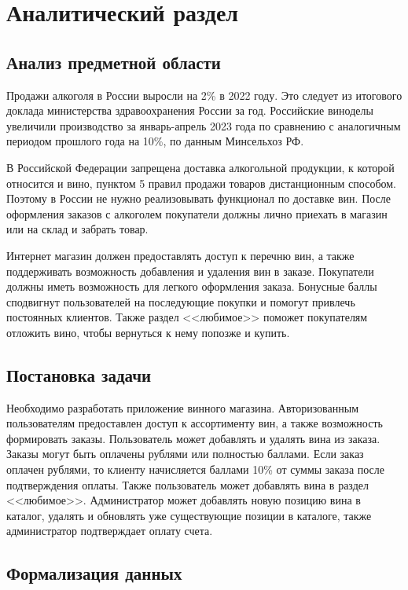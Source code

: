 \chapter{Аналитический раздел}


\section{Анализ предметной области}

Продажи алкоголя в России выросли на 2\% в 2022 году. Это следует из итогового доклада министерства здравоохранения России\cite{minzdrav} за год. Российские виноделы увеличили производство за январь-апрель 2023 года по сравнению с аналогичным периодом прошлого года на 10\%, по данным Минсельхоз РФ\cite{selhoz}. 

В Российской Федерации запрещена доставка алкогольной продукции, к которой относится и вино, пунктом 5 правил продажи товаров дистанционным способом\cite{pravila}. Поэтому в России не нужно реализовывать функционал по доставке вин. После оформления заказов с алкоголем покупатели должны лично приехать в магазин или на склад и забрать товар. 

Интернет магазин должен предоставлять доступ к перечню вин, а также поддерживать возможность добавления и удаления вин в заказе. Покупатели должны иметь возможность для легкого оформления заказа. Бонусные баллы сподвигнут пользователей на последующие покупки и помогут привлечь постоянных клиентов. Также раздел <<любимое>> поможет покупателям отложить вино, чтобы вернуться к нему попозже и купить.


\section{Постановка задачи}

Необходимо разработать приложение винного магазина. Авторизованным пользователям предоставлен доступ к ассортименту вин, 
а также возможность формировать заказы. Пользователь может добавлять и удалять вина из заказа. Заказы могут быть оплачены рублями или полностью баллами. Если заказ оплачен рублями, то клиенту начисляется баллами 10\% от суммы заказа после подтверждения оплаты. Также пользователь может добавлять вина в раздел <<любимое>>. Администратор может добавлять новую позицию вина в каталог, удалять и обновлять уже существующие позиции в каталоге, также администратор подтверждает оплату счета.


\section{Формализация данных}

